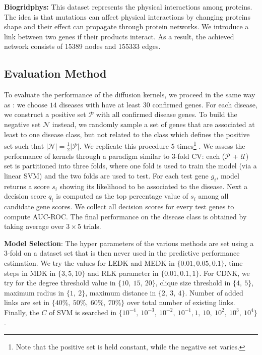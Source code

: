 \textbf{Biogridphys:} This dataset represents the physical interactions
among proteins. The idea is that mutations can affect physical interactions by
changing proteins shape and their effect can propagate through protein
networks. We introduce a link between two genes if their products interact. As
a result, the achieved network consists of 15389 nodes and 155333 edges.

\subsection{Evaluation Method}

To evaluate the performance of the diffusion kernels, we proceed in the same
way as \cite{proceeding3}: we choose $14$ diseases with have at least $30$
confirmed genes. For each disease, we construct a positive set
$\mathcal{P}$ with all confirmed disease genes. To build the negative set
$\mathcal{N}$ instead, we randomly sample a set of genes that are associated at least
to one disease class, but not related to the class which defines the positive
set such that $\vert \mathcal{N} \vert = \frac{1}{2} \vert \mathcal{P} \vert$.
We replicate this procedure 5 times\footnote{Note that the positive set is held constant, while the negative set varies.} . We assess the performance of kernels through a
paradigm similar to 3-fold CV: each ($\mathcal{P}$ + $\mathcal{U}$) set is
partitioned into three folds, where one fold is used to train the model (via a
linear SVM) and the two folds are used to test. For each test gene $g_i$,
model returns a score $s_i$ showing its likelihood to be associated to the
disease. Next a decision score $q_i$ is computed as the top percentage value
of $s_i$ among all candidate gene scores. We collect all decision scores for
every test genes to compute AUC-ROC. The final performance on the disease
class is obtained by taking average over $3\times$5 trials.

\textbf{Model Selection}: The hyper parameters of the various methods are
set using a 3-fold on a dataset set that is then never used in the predictive
performance estimation. We try the values for LEDK and MEDK in $\lbrace  0.01,
0.05, 0.1 \rbrace$, time steps in MDK in $\lbrace 3, 5, 10 \rbrace$ and RLK
parameter in $\lbrace 0.01, 0.1, 1 \rbrace$. For CDNK, we try for the degree
threshold value in $\lbrace 10,\ 15,\ 20 \rbrace$, clique size threshold in
$\lbrace 4,\ 5 \rbrace$, maximum radius in $\lbrace 1,\ 2 \rbrace$, maximum
distance in $\lbrace 2,\ 3,\ 4 \rbrace$. Number of added links are set in
$\lbrace 40\%,\ 50\%,\ 60\%,\ 70\% \rbrace$ over total number of existing
links. Finally, the $C$ of SVM is searched in $\lbrace 10^{-4},  \ 10^{-3}, \
10^{-2},\ 10^{-1}, 1,\ 10,\ 10^2, \ 10^3,\ 10^4 \rbrace$.
